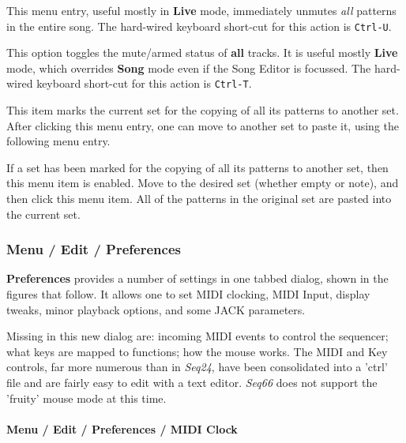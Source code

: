    This menu entry, useful mostly in \textbf{Live} mode,
   immediately unmutes \textsl{all} patterns in the entire song.
   The hard-wired keyboard short-cut for this action is \texttt{Ctrl-U}.

   This option toggles the mute/armed status of \textbf{all} tracks.
   It is useful mostly \textbf{Live} mode, which overrides \textbf{Song}
   mode even if the Song Editor is focussed.
   The hard-wired keyboard short-cut for this action is \texttt{Ctrl-T}.

   This item marks the current set for the copying of all its patterns to
   another set.
   After clicking this menu entry, one can move to another set to paste it,
   using the following menu entry.

   If a set has been marked for the copying of all its patterns to
   another set, then this menu item is enabled.
   Move to the desired set (whether empty or note), and then
   click this menu item.
   All of the patterns in the original set are pasted into the current set.


\subsubsection{Menu / Edit / Preferences}
\label{subsubsec:menu_edit_preferences}

   \textbf{Preferences} provides a number of settings in one
   tabbed dialog, shown in the figures that follow.
   It allows one to set MIDI clocking, MIDI Input, display tweaks, minor
   playback options, and some JACK parameters.

   Missing in this new dialog are:
      incoming MIDI events to control the sequencer;
      what keys are mapped to functions;
      how the mouse works.
   The MIDI and Key controls, far more numerous than in \textsl{Seq24}, have
   been consolidated into a 'ctrl' file and are fairly easy to edit with a text
   editor.
   \textsl{Seq66} does not support the 'fruity' mouse mode at this time.

\paragraph{Menu / Edit / Preferences / MIDI Clock}
\label{paragraph:menu_edit_preferences_midi_clock}


